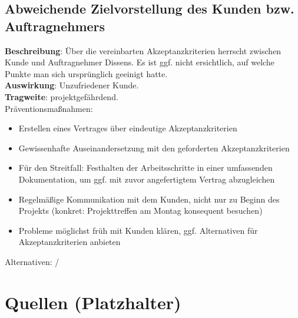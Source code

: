 \documentclass[a4paper, 12pt, titlepage]{scrartcl}
\begin{document}
	\subsection{Abweichende Zielvorstellung des Kunden bzw. Auftragnehmers}
		\textbf{Beschreibung}: \"Uber die vereinbarten Akzeptanzkriterien herrscht zwischen Kunde und Auftragnehmer Dissens. Es ist ggf. nicht ersichtlich, auf welche Punkte man sich urspr\"unglich geeinigt hatte.\\
		\textbf{Auswirkung}: Unzufriedener Kunde.\\
		\textbf{Tragweite}: projektgef\"ahrdend.\\
		Pr\"aventionsma\ss nahmen:
			\begin{itemize}
				\item Erstellen eines Vertrages \"uber eindeutige Akzeptanzkriterien
				\item Gewissenhafte Auseinandersetzung mit den geforderten Akzeptanzkriterien
				\item F\"ur den Streitfall: Festhalten der Arbeitsschritte in einer umfassenden Dokumentation, um ggf. mit zuvor angefertigtem Vertrag abzugleichen
				\item Regelm\"a\ss ige Kommunikation mit dem Kunden, nicht nur zu Beginn des Projekts (konkret: Projekttreffen am Montag konsequent besuchen)
				\item Probleme m\"oglichst fr\"uh mit Kunden kl\"aren, ggf. Alternativen f\"ur Akzeptanzkriterien anbieten
			\end{itemize}
		Alternativen: /

\section{Quellen (Platzhalter)}
\end{document}
